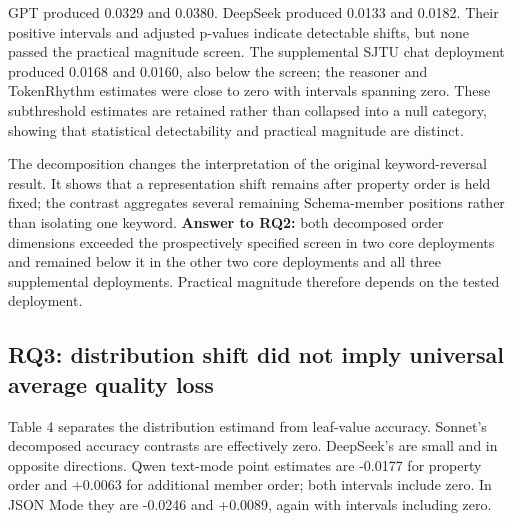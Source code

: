 \documentclass[11pt,a4paper]{article}
\begin{document}
GPT produced 0.0329 and 0.0380. DeepSeek produced 0.0133 and 0.0182. Their positive intervals and adjusted p-values indicate detectable shifts, but none passed the practical magnitude screen. The supplemental SJTU chat deployment produced 0.0168 and 0.0160, also below the screen; the reasoner and TokenRhythm estimates were close to zero with intervals spanning zero. These subthreshold estimates are retained rather than collapsed into a null category, showing that statistical detectability and practical magnitude are distinct.

The decomposition changes the interpretation of the original keyword-reversal result. It shows that a representation shift remains after property order is held fixed; the contrast aggregates several remaining Schema-member positions rather than isolating one keyword. \textbf{Answer to RQ2:} both decomposed order dimensions exceeded the prospectively specified screen in two core deployments and remained below it in the other two core deployments and all three supplemental deployments. Practical magnitude therefore depends on the tested deployment.

\subsection{RQ3: distribution shift did not imply universal average quality loss}
Table 4 separates the distribution estimand from leaf-value accuracy. Sonnet's decomposed accuracy contrasts are effectively zero. DeepSeek's are small and in opposite directions. Qwen text-mode point estimates are -0.0177 for property order and +0.0063 for additional member order; both intervals include zero. In JSON Mode they are -0.0246 and +0.0089, again with intervals including zero.
\end{document}

